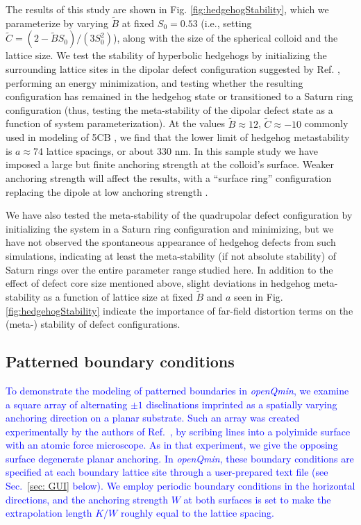 \documentclass[utf8]{frontiersFPHY} %
\newcommand{\DAB}[1]{\textcolor{blue}{#1}}
\newcommand{\DMS}[1]{\textcolor{blue}{#1}}
\def\PackageName{\textit{openQmin}}
\begin{document}
The results of this study are shown in Fig. \ref{fig:hedgehogStability}, which we parameterize by varying $\tilde{B}$ at fixed $S_0=0.53$ (i.e., setting $\tilde{C}=(2-\tilde{B} S_0)/(3S_0^2)$), along with the size of the spherical colloid and the lattice size. We test the stability of hyperbolic hedgehogs by initializing the surrounding lattice sites in the dipolar defect configuration suggested by Ref. \citep{Lubensky1998}, performing an energy minimization, and testing whether the resulting configuration has remained in the hedgehog state or transitioned to a Saturn ring configuration (thus, testing the meta-stability of the dipolar defect state as a function of system parameterization). At the values $\tilde B \approx 12$, $\tilde C \approx -10$ commonly used in modeling of 5CB \citep{ravnik2009landau}, we  find that the lower limit of hedgehog metastability is $a \approx 74$ lattice spacings, or about 330 nm. In this sample study we have imposed a large but finite anchoring strength at the colloid's surface. Weaker anchoring strength will affect the results, with a ``surface ring'' configuration replacing the dipole at low anchoring strength \citep{Stark2001}. 


We have also tested the meta-stability of the quadrupolar defect configuration by initializing the system in a Saturn ring configuration and minimizing, but we have not observed the spontaneous appearance of hedgehog defects from such simulations, indicating at least the meta-stability (if not absolute stability) of Saturn rings over the entire parameter range studied here. In addition to the effect of defect core size mentioned above, slight deviations in hedgehog meta-stability as a function of lattice size at fixed $\tilde{B}$ and $a$ seen in Fig. \ref{fig:hedgehogStability} indicate the importance of far-field distortion terms on the (meta-) stability of defect configurations.

\subsection{Patterned boundary conditions}

\DAB{To demonstrate the modeling of patterned boundaries in \PackageName, we examine a square array of alternating $\pm 1$ disclinations imprinted as a spatially varying anchoring direction on a planar substrate. Such an array was created experimentally by the authors of Ref.~\cite{murray2014creating}, by scribing lines into a polyimide surface with an atomic force microscope. As in that experiment, we give the opposing surface degenerate planar anchoring. In \PackageName, these boundary conditions are specified at each boundary lattice site through a user-prepared text file} \DMS{(see Sec.~\ref{sec: GUI} below).} \DAB{ We employ periodic boundary conditions  in the horizontal directions, and the anchoring strength $W$ at both surfaces is set to make the extrapolation length $K/W$ roughly equal to the lattice spacing. }
\end{document}
